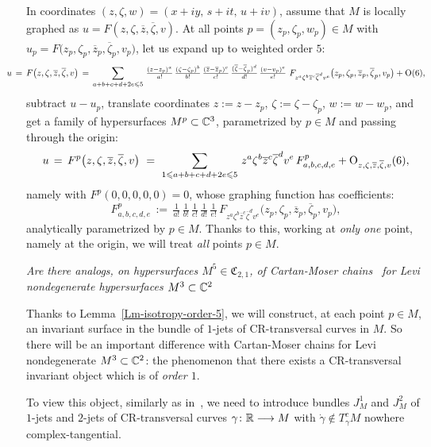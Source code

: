 \documentclass[12pt,twoside,leqno,openany]{amsart}
\begin{document}
In coordinates $(z, \zeta, w) = (x+iy,\, s+it,\, u+iv)$,
assume that $M$ is locally graphed as $u = F(z, \zeta,
\overline{z}, \overline{\zeta}, v)$. At all points
$p = (z_p, \zeta_p, w_p) \in M$ with $u_p = 
F\big( z_p, \zeta_p, \overline{z}_p, \overline{\zeta}_p,
v_p \big)$, let us expand up to weighted order $5$:
\[
\!\!\!\!\!\!\!\!\!\!\!\!\!\!\!
\aligned
u
\,=\,
F\big(
z,\zeta,\overline{z},\overline{\zeta},v
\big)
\,=\,
\sum_{a+b+c+d+2e\leqslant 5}\,
\tfrac{(z-z_p)^a}{a!}\,
\tfrac{(\zeta-\zeta_p)^b}{b!}\,
\tfrac{(\overline{z}-\overline{z}_p)^c}{c!}\,
\tfrac{(\overline{\zeta}-\overline{\zeta}_p)^d}{d!}\,
\tfrac{(v-v_p)^e}{e!}\,\,
F_{z^a\zeta^b\overline{z}^c\overline{\zeta}^dv^e}
\big(
z_p,\zeta_p,\overline{z}_p,\overline{\zeta}_p,v_p
\big)
+
{\rm O}(6),
\endaligned
\]
subtract $u - u_p$, translate coordinates $z := z-z_p$,
$\zeta := \zeta - \zeta_p$, $w := w - w_p$,
and get a family of hypersurfaces $M^p \subset \mathbb{C}^3$,
parametrized by $p \in M$ and passing through the origin:
\[
u
\,=\,
F^p\big(
z,\zeta,\overline{z},\overline{\zeta},v
\big)
\,\,=\,\,
\sum_{1\leqslant a+b+c+d+2e\leqslant 5}\,
z^a\zeta^b\overline{z}^c\overline{\zeta}^dv^e\,
F_{a,b,c,d,e}^p
+
{\rm O}_{z,\zeta,\overline{z},\overline{\zeta},v}(6),
\]
namely with $F^p(0,0,0,0,0) = 0$, whose graphing
function has coefficients:
\[
F_{a,b,c,d,e}^p
\,:=\,
\tfrac{1}{a!}\,
\tfrac{1}{b!}\,
\tfrac{1}{c!}\,
\tfrac{1}{d!}\,
\tfrac{1}{e!}\,
F_{z^a\zeta^b\overline{z}^c\overline{\zeta}^dv^e}
\big(
z_p,\zeta_p,\overline{z}_p,\overline{\zeta}_p,v_p
\big),
\]
analytically parametrized by $p \in M$. 
Thanks to this, working at {\em only one} point,
namely at the origin, we will treat {\em all} points
$p \in M$.

\begin{Question}
{\sl Are there analogs, on hypersurfaces $M^5 \in \mathfrak{C}_{2,1}$,
of Cartan-Moser chains~{\cite{Cartan-1932-I, Cartan-1932-I, 
Jacobowitz-1990, Merker-2020}}
for Levi nondegenerate 
hypersurfaces $M^3 \subset \mathbb{C}^2$}
\end{Question}

Thanks to Lemma~{\ref{Lm-isotropy-order-5}}, we will construct,
at each point $p \in M$, 
an invariant surface in the bundle of $1$-jets of
CR-transversal curves
in $M$.
So there will be an important difference with
Cartan-Moser chains for
Levi nondegenerate $M^3 \subset \mathbb{C}^2$: the phenomenon
that there exists a CR-transversal
invariant object which is of {\em order $1$}.

To view this object, similarly as in~{\cite{Merker-2020}},
we need to introduce bundles $J_M^1$ and $J_M^2$ of
$1$-jets and $2$-jets of CR-transversal curves
$\gamma \colon \mathbb{R} \longrightarrow M$ with
$\dot{\gamma} \not\in T_\gamma^cM$ nowhere complex-tangential.
\end{document}
